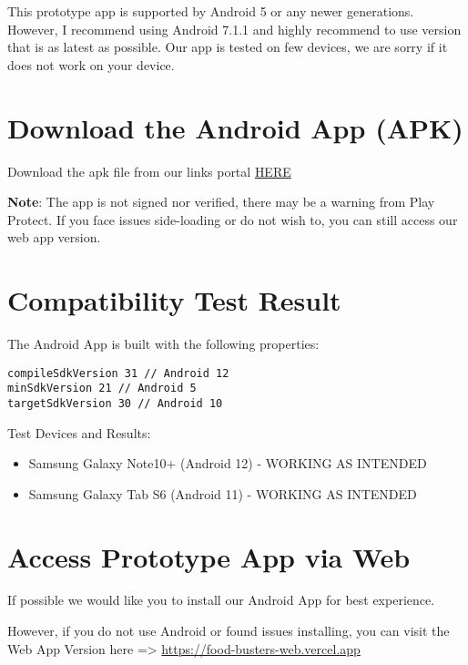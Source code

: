 \documentclass[a4paper,12pt]{article}
\begin{document}
This prototype app is supported by Android 5 or any newer generations.
However, I recommend using Android 7.1.1 and highly recommend to use version
that is as latest as possible.
Our app is tested on few devices, we are sorry if it does not work on your device.

\section*{Download the Android App (APK)}

\noindent
\begin{simplechar}
Download the apk file from our links portal \href{https://food-busters.github.io/prototype}{HERE}
\end{simplechar}

\noindent
\textbf{Note}: The app is not signed nor verified, there may be a warning from Play Protect.
If you face issues side-loading or do not wish to, you can still access our web app version.

\section*{Compatibility Test Result}

\noindent
The Android App is built with the following properties:
\begin{lstlisting}
compileSdkVersion 31 // Android 12
minSdkVersion 21 // Android 5
targetSdkVersion 30 // Android 10
\end{lstlisting}

\noindent
Test Devices and Results:
\begin{itemize}
    \item Samsung Galaxy Note10+ (Android 12) - WORKING AS INTENDED
    \item Samsung Galaxy Tab S6 (Android 11) - WORKING AS INTENDED
\end{itemize}

\section*{Access Prototype App via Web}

If possible we would like you to install our Android App for best experience.

However, if you do not use Android or found issues installing,
you can visit the Web App Version here => \href{https://food-busters-web.vercel.app}{
    https://food-busters-web.vercel.app}
\end{document}
